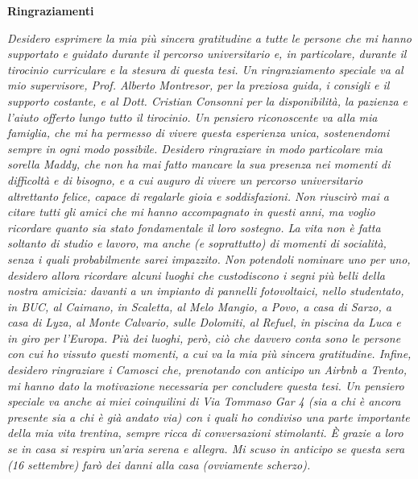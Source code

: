 \thispagestyle{empty}

\begin{center}
  {\bf \Huge Ringraziamenti}
\end{center}

\vspace{2cm}

\emph{
Desidero esprimere la mia più sincera gratitudine a tutte le persone che mi hanno supportato e guidato durante il percorso universitario e, in particolare, durante il tirocinio curriculare e la stesura di questa tesi. Un ringraziamento speciale va al mio supervisore, Prof. Alberto Montresor, per la preziosa guida, i consigli e il supporto costante, e al Dott. Cristian Consonni per la disponibilità, la pazienza e l’aiuto offerto lungo tutto il tirocinio. Un pensiero riconoscente va alla mia famiglia, che mi ha permesso di vivere questa esperienza unica, sostenendomi sempre in ogni modo possibile. Desidero ringraziare in modo particolare mia sorella Maddy, che non ha mai fatto mancare la sua presenza nei momenti di difficoltà e di bisogno, e a cui auguro di vivere un percorso universitario altrettanto felice, capace di regalarle gioia e soddisfazioni. Non riuscirò mai a citare tutti gli amici che mi hanno accompagnato in questi anni, ma voglio ricordare quanto sia stato fondamentale il loro sostegno. La vita non è fatta soltanto di studio e lavoro, ma anche (e soprattutto) di momenti di socialità, senza i quali probabilmente sarei impazzito. Non potendoli nominare uno per uno, desidero allora ricordare alcuni luoghi che custodiscono i segni più belli della nostra amicizia: davanti a un impianto di pannelli fotovoltaici, nello studentato, in BUC, al Caimano, in Scaletta, al Melo Mangio, a Povo, a casa di Sarzo, a casa di Lyza, al Monte Calvario, sulle Dolomiti, al Refuel, in piscina da Luca e in giro per l’Europa. Più dei luoghi, però, ciò che davvero conta sono le persone con cui ho vissuto questi momenti, a cui va la mia più sincera gratitudine. Infine, desidero ringraziare i Camosci che, prenotando con anticipo un Airbnb a Trento, mi hanno dato la motivazione necessaria per concludere questa tesi. Un pensiero speciale va anche ai miei coinquilini di Via Tommaso Gar 4 (sia a chi è ancora presente sia a chi è già andato via) con i quali ho condiviso una parte importante della mia vita trentina, sempre ricca di conversazioni stimolanti. È grazie a loro se in casa si respira un’aria serena e allegra. Mi scuso in anticipo se questa sera (16 settembre) farò dei danni alla casa (ovviamente scherzo).
}

